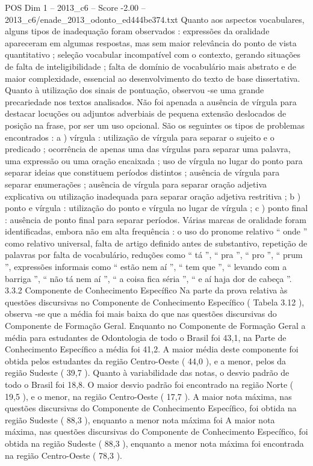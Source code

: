 \begin{textsample}{POS Dim 1 – 2013\_c6 – Score -2.00 – 2013\_c6/enade\_2013\_odonto\_ed444be374.txt}
Quanto aos aspectos vocabulares, alguns tipos de inadequação foram observados : expressões da oralidade apareceram em algumas respostas, mas sem maior relevância do ponto de vista quantitativo ; seleção vocabular incompatível com o contexto, gerando situações de falta de inteligibilidade ; falta de domínio de vocabulário mais abstrato e de maior complexidade, essencial ao desenvolvimento do texto de base dissertativa.
Quanto à utilização dos sinais de pontuação, observou -se uma grande precariedade nos textos analisados.
Não foi apenada a ausência de vírgula para destacar locuções ou adjuntos adverbiais de pequena extensão deslocados de posição na frase, por ser um uso opcional.
São os seguintes os tipos de problemas encontrados : a ) vírgula : utilização de vírgula para separar o sujeito e o predicado ; ocorrência de apenas uma das vírgulas para separar uma palavra, uma expressão ou uma oração encaixada ; uso de vírgula no lugar do ponto para separar ideias que constituem períodos distintos ; ausência de vírgula para separar enumerações ; ausência de vírgula para separar oração adjetiva explicativa ou utilização inadequada para separar oração adjetiva restritiva ; b ) ponto e vírgula : utilização do ponto e vírgula no lugar de vírgula ; c ) ponto final : ausência de ponto final para separar períodos.
Várias marcas de oralidade foram identificadas, embora não em alta frequência : o uso do pronome relativo “ onde ” como relativo universal, falta de artigo definido antes de substantivo, repetição de palavras por falta de vocabulário, reduções como “ tá ”, “ pra ”, “ pro ”, “ prum ”, expressões informais como “ estão nem aí ”, “ tem que ”, “ levando com a barriga ”, “ não tá nem aí ”, “ a coisa fica séria ”, “ e aí haja dor de cabeça ”. 3.3.2 Componente de Conhecimento Específico Na parte da prova relativa às questões discursivas no Componente de Conhecimento Específico ( Tabela 3.12 ), observa -se que a média foi mais baixa do que nas questões discursivas do Componente de Formação Geral.
Enquanto no Componente de Formação Geral a média para estudantes de Odontologia de todo o Brasil foi 43,1, na Parte de Conhecimento Específico a média foi 41,2.
A maior média deste componente foi obtida pelos estudantes da região Centro-Oeste ( 44,0 ), e a menor, pelos da região Sudeste ( 39,7 ).
Quanto à variabilidade das notas, o desvio padrão de todo o Brasil foi 18,8.
O maior desvio padrão foi encontrado na região Norte ( 19,5 ), e o menor, na região Centro-Oeste ( 17,7 ).
A maior nota máxima, nas questões discursivas do Componente de Conhecimento Específico, foi obtida na região Sudeste ( 88,3 ), enquanto a menor nota máxima foi A maior nota máxima, nas questões discursivas do Componente de Conhecimento Específico, foi obtida na região Sudeste ( 88,3 ), enquanto a menor nota máxima foi encontrada na região Centro-Oeste ( 78,3 ).

\end{textsample}
